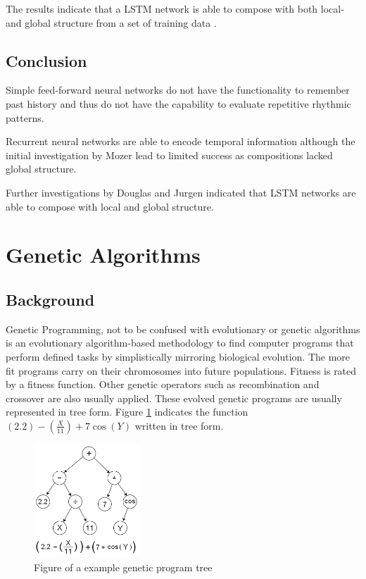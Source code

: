 The results indicate that a \ac{LSTM} network is able to compose with both local- and global structure from a set of training data \cite{Eck2002}.


\subsection{Conclusion}

Simple feed-forward neural networks do not have the functionality to remember past history and thus do not have the capability to evaluate repetitive rhythmic patterns.

Recurrent neural networks are able to encode temporal information although the initial investigation by Mozer lead to limited success as compositions lacked global structure. 

Further investigations by Douglas and Jurgen indicated that \ac{LSTM} networks are able to compose with local and global structure.

\section{Genetic Algorithms}
\subsection{Background}

Genetic Programming, not to be confused with evolutionary or genetic algorithms is an evolutionary algorithm-based methodology to find computer programs that perform defined tasks by simplistically mirroring biological evolution.
The more fit programs carry on their chromosomes into future populations. Fitness is rated by a fitness function. Other genetic operators such as recombination and crossover are also usually applied. 
These evolved genetic programs are usually represented in tree form. Figure \ref{ims:gpt} indicates the function $ (2.2) - (\frac{X}{11}) + 7\cos(Y)$ written in tree form.
\begin{figure}[!bh]
\centerline{\includegraphics[width=150px]{../images/gpt.png}}
\caption{Figure of a example genetic program tree}
\label{ims:gpt}
\end{figure}

